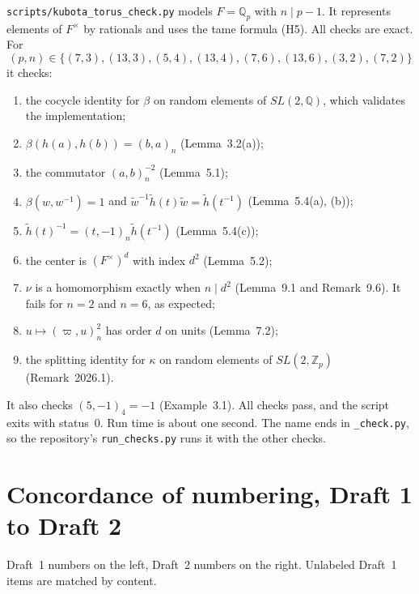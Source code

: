 \documentclass[12pt,letterpaper]{article}
\newcommand{\hl}{\tilde h}
\newcommand{\wt}{\tilde w}
\begin{document}
\texttt{scripts/kubota\_torus\_check.py} models $F=\mathbb Q_p$ with
$n\mid p-1$. It represents elements of $F^\times$ by rationals and uses
the tame formula (H5). All checks are exact. For
\[
(p,n)\in\{(7,3),(13,3),(5,4),(13,4),(7,6),(13,6),(3,2),(7,2)\}
\]
it checks:
\begin{enumerate}[leftmargin=*]
\item the cocycle identity for $\beta$ on random elements of
  $SL(2,\mathbb Q)$, which validates the implementation;
\item $\beta(h(a),h(b))=(b,a)_n$ (Lemma~3.2(a));
\item the commutator $(a,b)_n^{-2}$ (Lemma~5.1);
\item $\beta(w,w^{-1})=1$ and $\wt^{-1}\hl(t)\wt=\hl(t^{-1})$
  (Lemma~5.4(a), (b));
\item $\hl(t)^{-1}=(t,-1)_n\hl(t^{-1})$ (Lemma~5.4(c));
\item the center is $(F^\times)^d$ with index $d^2$ (Lemma~5.2);
\item $\nu$ is a homomorphism exactly when $n\mid d^2$ (Lemma~9.1 and
  Remark~9.6). It fails for $n=2$ and $n=6$, as expected;
\item $u\mapsto(\varpi,u)_n^2$ has order $d$ on units (Lemma~7.2);
\item the splitting identity for $\kappa$ on random elements of
  $SL(2,\mathbb Z_p)$ (Remark~2026.1).
\end{enumerate}
It also checks $(5,-1)_4=-1$ (Example~3.1). All checks pass, and the
script exits with status~0. Run time is about one second. The name ends
in \texttt{\_check.py}, so the repository's \texttt{run\_checks.py}
runs it with the other checks.

\section{Concordance of numbering, Draft 1 to Draft 2}\label{sec:concordance}

Draft~1 numbers on the left, Draft~2 numbers on the right. Unlabeled
Draft~1 items are matched by content.
\end{document}
